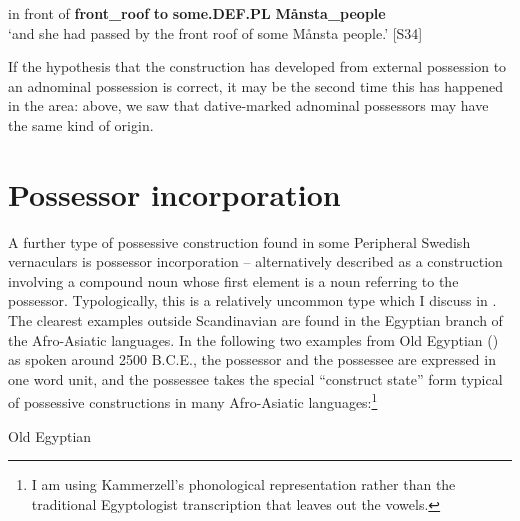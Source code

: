 in front of   \textbf{front\_roof} \textbf{to} \textbf{some.DEF.PL} \textbf{Månsta\_people}\\

\glt ‘and she had passed by the front roof of some Månsta people.’ [S34]

\z

If the hypothesis that the  construction has developed from external possession to an adnominal possession is correct, it may be the second time this has happened in the area: above, we saw that dative-marked adnominal possessors may have the same kind of origin. 


\section{Possessor incorporation}

A further type of possessive construction found in some Peripheral Swedish vernaculars is possessor incorporation – alternatively described as a construction involving a compound noun whose first element is a noun referring to the possessor. Typologically, this is a relatively uncommon type which I discuss in \citet{Dahl2004}. The clearest examples outside Scandinavian are found in the Egyptian branch of the Afro-Asiatic languages. In the following two examples from Old Egyptian (\citet{Kammerzell2000}) as spoken around 2500 B.C.E., the possessor and the possessee are expressed in one word unit, and the possessee takes the special “construct state” form typical of possessive constructions in many Afro-Asiatic languages:\footnote{ I am using Kammerzell’s phonological representation rather than the traditional Egyptologist transcription that leaves out the vowels.}


\item 

Old Egyptian



